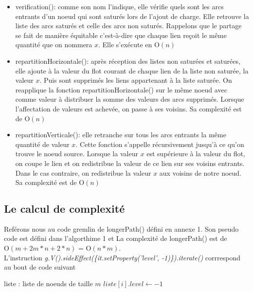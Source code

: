 \documentclass[onecolumn, 12pt]{article}
\begin{document}
\begin{itemize}
	\item verification(): comme son nom l'indique, elle v\'erifie quels sont les arcs entrants d'un noeud qui sont satur\'es lors de l'ajout de charge. Elle retrouve la liste des arcs satur\'es et celle des arcs non satur\'es. Rappelons que le partage se fait de mani\`ere \'equitable c'est-\`a-dire que chaque lien re\c coit le m\^eme quantit\'e que on nommera $x$. Elle s'ex\'ecute en  $\mathrm{O}{(n)}$
	\item repartitionHorizontale(): apr\`es r\'eception des listes non satur\'ees et satur\'ees, elle ajoute \`a la valeur du flot courant de chaque lien de la liste non satur\'ee, la valeur $x$. Puis sont supprim\'es les liens appartenant \`a la liste satur\'ee. On reapplique la fonction repartitionHorizontale() sur le m\^eme noeud avec comme valeur \`a distribuer la somme des valeurs des arcs supprim\'es. Lorsque l'affectation de valeurs est achev\'ee, on passe \`a ses voisins. Sa complexit\'e est de $\mathrm{O}{(n)}$
	\item repartitionVerticale():  elle retranche sur tous les arcs entrants la m\^eme quantit\'e de valeur $x$. Cette fonction s'appelle r\'ecursivement jusqu'\`a ce qu'on trouve le noeud source.  Lorsque  la valeur $x$ est sup\'erieure \`a la valeur du flot, on coupe le lien et on redistribue la valeur de ce lien sur ses voisins entrants. Dans le cas contraire, on redistribue la valeur $x$ aux voisins de notre noeud. Sa complexit\'e est de $\mathrm{O}{(n)}$
\end{itemize}

\subsection{Le calcul de complexit\'e}
Ref\'erons nous au code gremlin de longerPath() d\'efini en annexe 1. Son pseudo code est d\'efini  dans l'algorthime 1 et La complexit\'e de longerPath() est de  $\mathrm{O}{(m+2m*n+2*n)}$ = $\mathrm{O}{(n*m)}$.\\
L'instruction \emph{g.V().sideEffect(\{it.setProperty('level', -1)\}).iterate()} corrrespond au bout de code suivant 
\begin{algorithmic}
\REQUIRE liste : liste de noeuds de taille $m$
	\STATE	$liste[i].level \leftarrow -1 $
\ENDFOR
\end{algorithmic}
\end{document}
